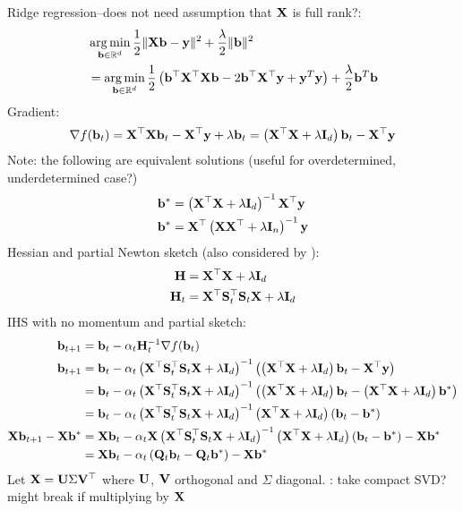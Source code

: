 \documentclass[10pt]{article}
\begin{document}
Ridge regression--does not need assumption that $\mathbf{X}$ is full rank?:
\begin{align*}
&\operatorname*{arg\,min}_{\mathbf{b}\in\mathbb{R}^d} \frac{1}{2}\|\mathbf{X}\mathbf{b}-\mathbf{y}\|^2 + \frac{\lambda}{2}\|\mathbf{b}\|^2 \\
&= \operatorname*{arg\,min}_{\mathbf{b}\in\mathbb{R}^d} \frac{1}{2}\left(\mathbf{b}^\top\mathbf{X}^\top\mathbf{X}\mathbf{b} - 2\mathbf{b}^\top\mathbf{X}^\top\mathbf{y} + \mathbf{y}^T\mathbf{y}\right) + \frac{\lambda}{2}\mathbf{b}^T\mathbf{b} \\
\end{align*}
Gradient:
\[
\nabla f(\mathbf{b}_t) = \mathbf{X}^\top\mathbf{X}\mathbf{b}_t - \mathbf{X}^\top\mathbf{y} + \lambda\mathbf{b}_t = \left(\mathbf{X}^\top\mathbf{X}+\lambda\mathbf{I}_d\right)\mathbf{b}_t - \mathbf{X}^\top\mathbf{y}
\]
Note: the following are equivalent solutions (useful for overdetermined, underdetermined case?)
\begin{align*}
\mathbf{b}^* &= \left(\mathbf{X}^\top\mathbf{X}+\lambda\mathbf{I}_d\right)^{-1}\mathbf{X}^\top\mathbf{y} \\
\mathbf{b}^* &= \mathbf{X}^\top\left(\mathbf{X}\mathbf{X}^\top+\lambda\mathbf{I}_n\right)^{-1}\mathbf{y}
\end{align*}
Hessian and partial Newton sketch (also considered by \citet{Chowdhury:2018}):
\begin{align*}
\mathbf{H} &= \mathbf{X}^\top\mathbf{X}+\lambda\mathbf{I}_d \\
\mathbf{H}_t &= \mathbf{X}^\top\mathbf{S}_t^\top\mathbf{S}_t\mathbf{X} + \lambda\mathbf{I}_d
\end{align*}
IHS with no momentum and partial sketch:
\begin{align*}
\mathbf{b}_{t+1} &= \mathbf{b}_t - \alpha_t\mathbf{H}_t^{-1}\nabla f(\mathbf{b}_t) \\
\mathbf{b}_{t+1} &= \mathbf{b}_t - \alpha_t\left(\mathbf{X}^\top\mathbf{S}_t^\top\mathbf{S}_t\mathbf{X} + \lambda\mathbf{I}_d\right)^{-1}\left(\left(\mathbf{X}^\top\mathbf{X}+\lambda\mathbf{I}_d\right)\mathbf{b}_t-\mathbf{X}^\top\mathbf{y}\right) \\
&= \mathbf{b}_t - \alpha_t\left(\mathbf{X}^\top\mathbf{S}_t^\top\mathbf{S}_t\mathbf{X} + \lambda\mathbf{I}_d\right)^{-1}\left(\left(\mathbf{X}^\top\mathbf{X}+\lambda\mathbf{I}_d\right)\mathbf{b}_t-\left(\mathbf{X}^\top\mathbf{X}+\lambda\mathbf{I}_d\right)\mathbf{b}^*\right) \\
&= \mathbf{b}_t - \alpha_t\left(\mathbf{X}^\top\mathbf{S}_t^\top\mathbf{S}_t\mathbf{X} + \lambda\mathbf{I}_d\right)^{-1}\left(\mathbf{X}^\top\mathbf{X}+\lambda\mathbf{I}_d\right)\left(\mathbf{b}_t-\mathbf{b}^*\right) \\
\mathbf{X}\mathbf{b}_{t+1} - \mathbf{X}\mathbf{b}^* &= \mathbf{X}\mathbf{b}_t - \alpha_t\mathbf{X}\left(\mathbf{X}^\top\mathbf{S}_t^\top\mathbf{S}_t\mathbf{X} + \lambda\mathbf{I}_d\right)^{-1}\left(\mathbf{X}^\top\mathbf{X}+\lambda\mathbf{I}_d\right)\left(\mathbf{b}_t-\mathbf{b}^*\right) - \mathbf{X}\mathbf{b}^* \\
&= \mathbf{X}\mathbf{b}_t - \alpha_t\left(\mathbf{Q}_t\mathbf{b}_t-\mathbf{Q}_t\mathbf{b}^*\right) - \mathbf{X}\mathbf{b}^*
\end{align*}
Let $\mathbf{X} = \mathbf{U}\Sigma\mathbf{V}^\top$ where $\mathbf{U}$, $\mathbf{V}$ orthogonal and $\Sigma$ diagonal. \todo: take compact SVD? might break if multiplying by $\mathbf{X}$
\end{document}
